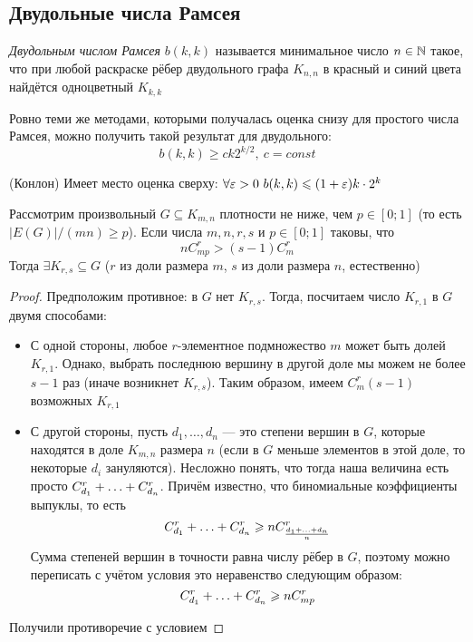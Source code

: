 \subsection{Двудольные числа Рамсея}

\begin{definition}
	\textit{Двудольным числом Рамсея} $b(k, k)$ называется минимальное число $n \in \mathbb{N}$ такое, что при любой раскраске рёбер двудольного графа $K_{n, n}$ в красный и синий цвета найдётся одноцветный $K_{k, k}$
\end{definition}

\begin{exercise}
	Ровно теми же методами, которыми получалась оценка снизу для простого числа Рамсея, можно получить такой результат для двудольного:
	\[
		b(k, k) \ge ck2^{k / 2},\ c = const
	\]
\end{exercise}

\begin{theorem} (Конлон)
	Имеет место оценка сверху: \(\forall \varepsilon > 0\ b(k, k) \leqslant (1 + \varepsilon)k \cdot 2^k\)
\end{theorem}

\begin{lemma}
	Рассмотрим произвольный $G \subseteq K_{m, n}$ плотности не ниже, чем $p \in [0; 1]$ (то есть $|E(G)| / (mn) \ge p$). Если числа $m, n, r, s$ и $p \in [0; 1]$ таковы, что
	\[
		nC_{mp}^r > (s - 1)C_m^r
	\]
	Тогда $\exists K_{r, s} \subseteq G$ ($r$ из доли размера $m$, $s$ из доли размера $n$, естественно)
\end{lemma}

\begin{proof}
	Предположим противное: в $G$ нет $K_{r, s}$. Тогда, посчитаем число $K_{r, 1}$ в $G$ двумя способами:
	\begin{itemize}
		\item С одной стороны, любое $r$-элементное подмножество $m$ может быть долей $K_{r, 1}$. Однако, выбрать последнюю вершину в другой доле мы можем не более $s - 1$ раз (иначе возникнет $K_{r, s}$). Таким образом, имеем $C_m^r (s - 1)$ возможных $K_{r, 1}$
		
		\item С другой стороны, пусть $d_1, \ldots, d_n$ --- это степени вершин в $G$, которые находятся в доле $K_{m, n}$ размера $n$ (если в $G$ меньше элементов в этой доле, то некоторые $d_i$ зануляются). Несложно понять, что тогда наша величина есть просто $C_{d_1}^r + \ldots + C_{d_n}^r$. Причём известно, что биномиальные коэффициенты выпуклы, то есть
		\[
			C_{d_1}^r + \ldots + C_{d_n}^r \geqslant n C_{\frac{d_1 + \ldots + d_n}{n}}^r
		\]
		Сумма степеней вершин в точности равна числу рёбер в $G$, поэтому можно переписать с учётом условия это неравенство следующим образом:
		\[
			C_{d_1}^r + \ldots + C_{d_n}^r \geqslant n C_{mp}^r
		\]
	\end{itemize}
	Получили противоречие с условием
\end{proof}

